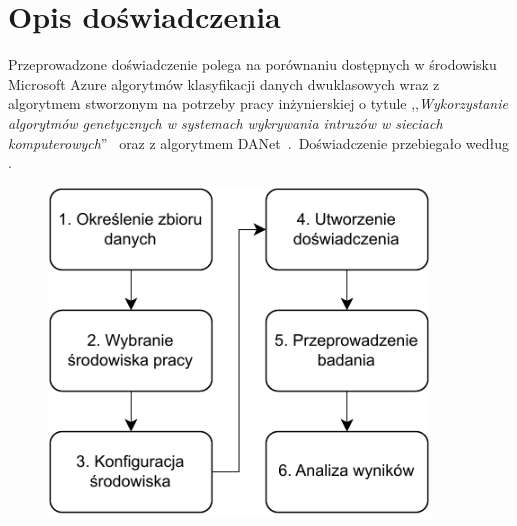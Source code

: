 \chapter{Opis doświadczenia}
\label{cha:dos}
Przeprowadzone doświadczenie polega na porównaniu dostępnych w środowisku Microsoft Azure algorytmów klasyfikacji danych dwuklasowych wraz z algorytmem stworzonym na potrzeby pracy inżynierskiej o tytule ,,\textit{Wykorzystanie algorytmów genetycznych w systemach wykrywania intruzów w sieciach komputerowych}''~\cite{Blyszcz2022} oraz z algorytmem DANet~\cite{Chen2022}.\ Doświadczenie przebiegało według .

\begin{figure}[H]
    \centering
    \includegraphics[width=0.9\textwidth]{images/schemat_pracy}
    \label{fig:sch-prac}
\end{figure}

\vfill
\pagebreak

